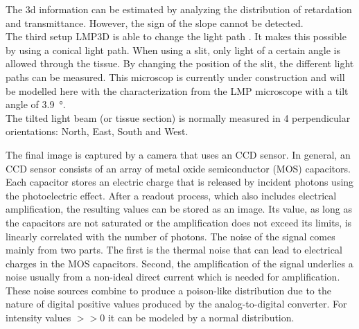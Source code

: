 The 3d information can be estimated by analyzing the distribution of retardation and transmittance.
However, the sign of the slope cannot be detected.
\\
The third setup \ac{LMP3D} is able to change the light path \cite{Wiese:887678}.
It makes this possible by using a conical light path.
When using a slit, only light of a certain angle is allowed through the tissue.
By changing the position of the slit, the different light paths can be measured.
This microscop is currently under construction and will be modelled here with the characterization from the \ac{LMP} microscope with a tilt angle of \SI{3.9}{\degree}.
\\
% 
The tilted light beam (or tissue section) is normally measured in 4 perpendicular orientations: North, East, South and West.
\par
% 
The final image is captured by a camera that uses an \ac{CCD} sensor.
In general, an \ac{CCD} sensor consists of an array of metal oxide semiconductor (MOS) capacitors.
Each capacitor stores an electric charge that is released by incident photons using the photoelectric effect.
After a readout process, which also includes electrical amplification, the resulting values can be stored as an image.
Its value, as long as the capacitors are not saturated or the amplification does not exceed its limits, is linearly correlated with the number of photons.
The noise of the signal comes mainly from two parts.
The first is the thermal noise that can lead to electrical charges in the MOS capacitors.
Second, the amplification of the signal underlies a noise usually from a non-ideal direct current which is needed for amplification.
These noise sources combine to produce a poison-like distribution due to the nature of digital positive values produced by the analog-to-digital converter.
For intensity values $>> 0$ it can be modeled by a normal distribution.
% 
% 
% 
